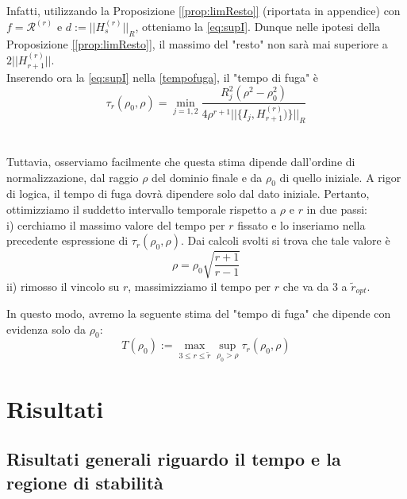 \documentclass[a4paper,11pt,titlepage]{report}
\theoremstyle{definition}
\theoremstyle{plain}
\begin{document}
Infatti, utilizzando la Proposizione \ref{[prop:limResto]} (riportata in appendice) con $f=\mathcal{R}^{(r)}$ e $d:=||H_s^{(r)}||_R$, otteniamo la \ref{eq:supI}.
Dunque nelle ipotesi della Proposizione \ref{[prop:limResto]}, il massimo del "resto" non sarà mai superiore a $2||H_{r+1}^{(r)}||$.
\\Inserendo ora la \ref{eq:supI} nella \ref{tempofuga}, il "tempo di fuga" è
\begin{equation}
\label{eq:tau}
 \tau_r( \rho_0, \rho) = \min_{j=1,2} \frac{R_j^2(\rho^2-\rho_0^2)}{4 \rho^{r+1}||\{I_j, H_{r+1}^{(r)})\}||_{R} } 
\end{equation}\\\\
Tuttavia, osserviamo facilmente che questa stima dipende dall'ordine di normalizzazione, dal raggio $\rho$ del dominio finale e da $\rho_0$ di quello iniziale.
A rigor di logica, il tempo di fuga dovrà dipendere solo dal dato iniziale. Pertanto, ottimizziamo il suddetto intervallo temporale rispetto a $\rho$ e $r$ in due passi:\\
i) cerchiamo il massimo valore del tempo per $r$ fissato e lo inseriamo nella precedente espressione di $\tau_r( \rho_0, \rho)$.
Dai calcoli svolti si trova che tale valore è $$ \rho = \rho_0 \sqrt{\frac{r+1}{r-1}} $$
ii) rimosso il vincolo su $r$, massimizziamo il tempo per $r$ che va da 3 a $\tilde{r}_{opt}$.

In questo modo, avremo la seguente stima  del "tempo di fuga" che dipende con evidenza solo da $\rho_0$: $$ T(\rho_0):= \max_{3 \leq r \leq \tilde{r}} \sup_{ \rho_0 > \rho} \tau_r( \rho_0, \rho) $$

\section{Risultati}

\subsection{Risultati generali riguardo il tempo e la regione di stabilità}
\end{document}

